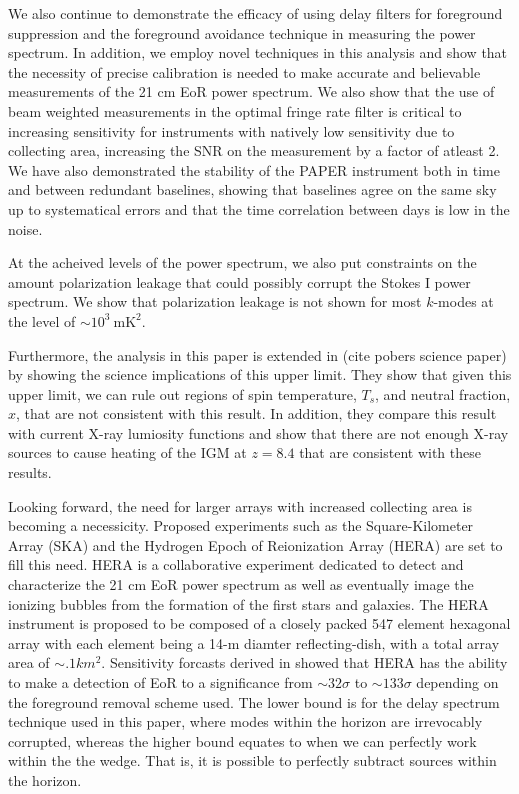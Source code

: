 \documentclass[twocolumn,numberedappendix]{emulateapj} \shorttitle{PSA64}
\begin{document}
We also continue to demonstrate the efficacy of using delay filters for
foreground suppression and the foreground avoidance technique in measuring the power
spectrum. In addition, we employ novel techniques in this analysis and show that
the necessity of precise calibration is needed to make accurate and believable
measurements of the 21 cm EoR power spectrum. We also show that the use of beam
weighted measurements in the optimal fringe rate filter is critical to
increasing sensitivity for instruments with natively low sensitivity due to
collecting area, increasing the SNR on the measurement by a factor of atleast 2.
We have also demonstrated the stability of the PAPER instrument both in time and
between redundant baselines, showing that baselines agree on the same sky up to
systematical errors and that the time correlation between days is low in the
noise.

At the acheived levels of the power spectrum, we also put constraints on the
amount polarization leakage that could possibly corrupt the Stokes I power
spectrum. We show that polarization leakage is not shown for most $k$-modes at
the level of $\sim10^{3}\ \text{mK}^{2}$. 

Furthermore, the analysis in this paper is extended in (cite pobers science
paper) by showing the science implications of this upper limit. They show that
given this upper limit, we can rule out regions of spin temperature, $T_{s}$,
and neutral fraction, $x$, that are not consistent with this result. In
addition, they compare this result with current X-ray lumiosity functions and
show that there are not enough X-ray sources to cause heating of the IGM at
$z=8.4$ that are consistent with these results.

Looking forward, the need for larger arrays with increased collecting area is
becoming a necessicity. Proposed experiments such as the Square-Kilometer Array
(SKA) and the Hydrogen Epoch of Reionization Array (HERA) are set to fill this
need. HERA is a collaborative experiment dedicated to detect and characterize
the 21 cm EoR power spectrum as well as eventually image the ionizing bubbles
from the formation of the first stars and galaxies. The HERA instrument
is proposed to be composed of a closely packed 547 element hexagonal array 
\citep{pober_et_al2014} with each element being a 14-m diamter
reflecting-dish, with a total array area of $\sim.1km^{2}$. Sensitivity forcasts
derived in \citet{pober_et_al2014} showed that HERA has the ability to make a
detection of EoR to a significance from $\sim32\sigma$ to $\sim133\sigma$
depending on the foreground removal scheme used. The lower bound is for the
delay spectrum technique used in this paper, where modes within the horizon are
irrevocably corrupted, whereas the higher bound equates to when we can perfectly
work within the the wedge. That is, it is possible to perfectly subtract sources
within the horizon.
\end{document}
